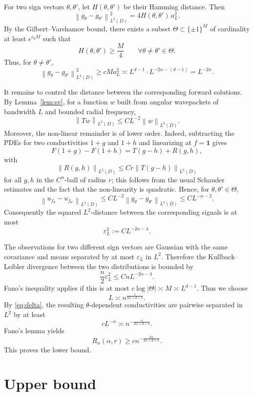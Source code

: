 \documentclass[11pt]{article}
\theoremstyle{remark}
\newcommand{\norm}[1]{\left\|#1\right\|}
\newcommand{\one}{\mathbf{1}}
\begin{document}
For two sign vectors $\theta,\theta'$, let
$H(\theta,\theta')$ be their Hamming distance. Then
\[
\norm{g_\theta-g_{\theta'}}_{L^2(D)}^2
=4 H(\theta,\theta')\, a_L^2.
\]
By the Gilbert--Varshamov bound, there exists a subset
$\Theta\subset\{\pm1\}^M$ of cardinality at least $e^{c_0 M}$ such that
\[
H(\theta,\theta')\ge \frac M4\qquad \forall \theta\neq\theta'\in\Theta.
\]
Thus, for $\theta\neq\theta'$,
\begin{equation}\label{eq:delta}
\norm{g_\theta-g_{\theta'}}_{L^2(D)}^2
\ge c M a_L^2
\asymp L^{d-1}\cdot L^{-2\alpha-(d-1)}
=L^{-2\alpha}.
\end{equation}

It remains to control the distance between the corresponding forward solutions.
By Lemma~\ref{lem:sv}, for a function $w$ built from angular wavepackets of
bandwidth $L$ and bounded radial frequency,
\[
\norm{Tw}_{L^2(D)}\le C L^{-2}\norm{w}_{L^2(D)}.
\]
Moreover, the non-linear remainder is of lower order. Indeed, subtracting the
PDEs for two conductivities $1+g$ and $1+h$ and linearizing at $f=\one$ gives
\[
F(1+g)-F(1+h)=T(g-h)+R(g,h),
\]
with
\[
\norm{R(g,h)}_{L^2(D)}\le C r \norm{T(g-h)}_{L^2(D)}
\]
for all $g,h$ in the $C^\alpha$-ball of radius $r$; this follows from the usual
Schauder estimates and the fact that the non-linearity is quadratic. Hence, for
$\theta,\theta'\in\Theta$,
\[
\norm{u_{f_\theta}-u_{f_{\theta'}}}_{L^2(D)}
\le C L^{-2}\norm{g_\theta-g_{\theta'}}_{L^2(D)}
\le C L^{-\alpha-2}.
\]
Consequently the squared $L^2$-distance between the corresponding signals is at most
\[
\varepsilon_L^2:=C L^{-2\alpha-4}.
\]

The observations for two different sign vectors are Gaussian with the same
covariance and means separated by at most $\varepsilon_L$ in $L^2$. Therefore
the Kullback--Leibler divergence between the two distributions is bounded by
\[
\frac n2 \varepsilon_L^2\le C n L^{-2\alpha-4}.
\]
Fano's inequality applies if this is at most $c\log|\Theta|\asymp M\asymp L^{d-1}$.
Thus we choose
\[
L\asymp n^{\frac1{2\alpha+d+3}}.
\]
By \eqref{eq:delta}, the resulting $\theta$-dependent conductivities are
pairwise separated in $L^2$ by at least
\[
c L^{-\alpha}
\asymp n^{-\frac{\alpha}{2\alpha+d+3}}.
\]
Fano's lemma yields
\[
R_n(\alpha,r)\ge c n^{-\frac{2\alpha}{2\alpha+d+3}}.
\]
This proves the lower bound.

\section{Upper bound}
\end{document}
